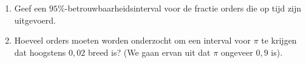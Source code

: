 \begin{enumerate}[label=(\alph*)]
    \item Geef een $95\%$-betrouwbaarheidsinterval voor de fractie orders die op tijd zijn uitgevoerd.
    \answer{

    }

    \item Hoeveel orders moeten worden onderzocht om een interval voor $\pi$ te krijgen dat hoogstens $0,02$ breed is? (We gaan ervan uit dat $\pi$ ongeveer $0,9$ is).
    \answer{
        
    }
\end{enumerate}